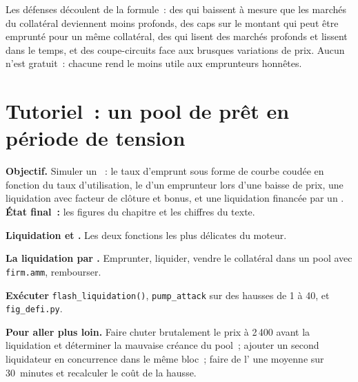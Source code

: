 Les défenses découlent de la formule~: des  qui baissent à mesure que les marchés du collatéral deviennent moins profonds, des caps sur le montant qui peut être emprunté
pour un même collatéral, des  qui lisent des marchés profonds et lissent dans le temps, et des coupe-circuits face aux brusques variations de prix. Aucun n'est gratuit~:
chacune rend le  moins utile aux emprunteurs honnêtes.

\section{Tutoriel~: un pool de prêt en période de tension}\label{tut:m3:defi-credit-and-leverage:pool}

\begin{tutorial}
\textbf{Objectif.} Simuler un ~: le taux d'emprunt sous forme de courbe coudée en fonction du taux d'utilisation, le  d'un emprunteur lors d'une baisse de prix, une
liquidation avec facteur de clôture et bonus, et une liquidation financée par un . \textbf{État final~:} les figures du chapitre et les chiffres du
texte.
\begin{tutsteps}
\item \textbf{Liquidation et .} Les deux fonctions les plus délicates du moteur.
\label{lst:m3:defi-credit-and-leverage:liq}
\item \textbf{La liquidation par .} Emprunter, liquider, vendre le collatéral dans un pool avec \texttt{firm.amm}, rembourser.
\label{lst:m3:defi-credit-and-leverage:flash}
\item \textbf{Exécuter} \texttt{flash\_liquidation()}, \texttt{pump\_attack} sur des hausses de 1 à 40, et \texttt{fig\_defi.py}.
\end{tutsteps}
\textbf{Pour aller plus loin.} Faire chuter brutalement le prix à 2\,400 avant la liquidation et déterminer la mauvaise créance du pool~; ajouter un second liquidateur en concurrence dans le même
bloc~; faire de l' une moyenne sur 30~minutes et recalculer le coût de la hausse.
\end{tutorial}

